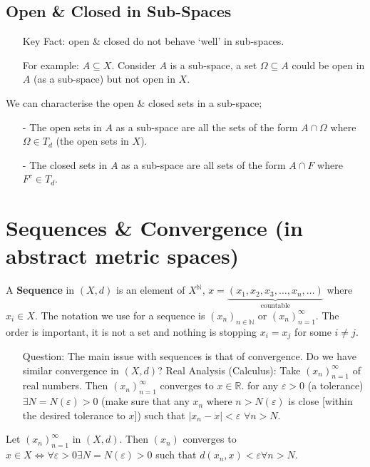\documentclass[10pt]{article}
\begin{document}
\subsection{Open \& Closed in Sub-Spaces}
\begin{itemize}
    \item[Key Fact:] open \& closed do not behave `well' in sub-spaces.
    \item[For example:] $A\subseteq X$. Consider $A$ is a sub-space, a set $\Omega\subseteq A$ could be open in $A$ (as a sub-space) but not open in $X$.
\end{itemize}
We can characterise the open \& closed sets in a sub-space;
\begin{itemize}
    \item[-] The open sets in $A$ as a  sub-space are all the sets of the form $A\cap\Omega$ where $\Omega\in T_{d}$ (the open sets in $X$).
    \item[-] The closed sets in $A$ as a sub-space are all sets of the form $A\cap F$ where $F^{c}\in T_{d}$.
\end{itemize}

\newpage
\section{Sequences \& Convergence (in abstract metric spaces)}
A \textbf{Sequence} in $(X,d)$ is an element of $X^{\mathbb{N}}$, $x=\underbrace{(x_{1}, x_{2}, x_{3}, \dots, x_{n}, \dots)}_{\text{countable}}$ where $x_{i}\in X$. The notation we use for a sequence is $(x_{n})_{n\in\mathbb{N}}$ or $(x_{n})_{n=1}^{\infty}$. The order is important, it is not a set and nothing is stopping $x_{i}=x_{j}$ for some $i\neq j$.
\begin{itemize}
    \item[Question:] The main issue with sequences is that of convergence. Do we have similar convergence in $(X,d)$?
    \subitem Real Analysis (Calculus): Take $(x_{n})_{n=1}^{\infty}$ of real numbers. Then $(x_{n})_{n=1}^{\infty}$ converges to $x\in\mathbb{R}$.
    \subitem for any $\varepsilon>0$ (a tolerance) $\exists N=N(\varepsilon)>0$ (make sure that any $x_{n}$ where $n>N(\varepsilon)$ is close [within the desired tolerance to $x$]) such that $|x_{n}-x|<\varepsilon\,\,\forall n>N$.
\end{itemize}
Let $(x_{n})_{n=1}^{\infty}$ in $(X,d)$. Then $(x_{n})$ converges to $x\in X\iff\forall\varepsilon>0\exists N=N(\varepsilon)>0$ such that $d(x_{n},x)<\varepsilon\forall n>N$.
\end{document}
